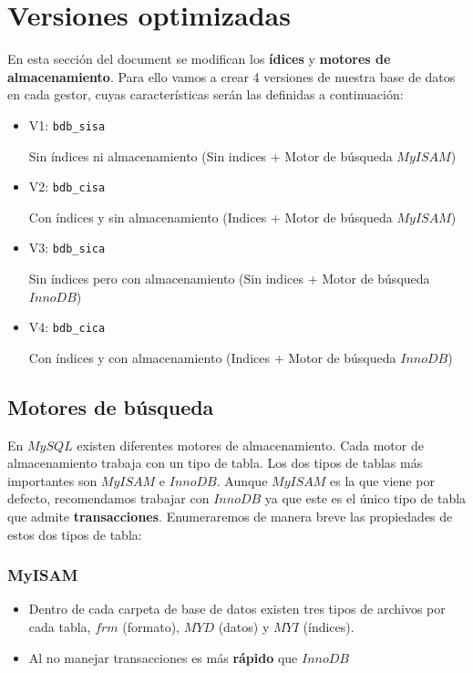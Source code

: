 \documentclass[12pt,a4paper]{article}
\begin{document}

\newpage
\section{Versiones optimizadas} \label{pto3} 

En esta sección del document se modifican los \textbf{ídices} y \textbf{motores de almacenamiento}. Para ello vamos a crear 4 versiones de nuestra base de datos en cada gestor, cuyas características serán las definidas a continuación:

\begin{itemize}
\item V1: \verb|bdb_sisa|

 Sin índices ni almacenamiento (Sin indices + Motor de búsqueda $MyISAM$)
\item V2: \verb|bdb_cisa|

Con índices y sin almacenamiento (Indices + Motor de búsqueda $MyISAM$)

\item V3: \verb|bdb_sica|

Sin índices pero con almacenamiento (Sin indices + Motor de búsqueda $InnoDB$)

\item V4: \verb|bdb_cica|

Con índices y con almacenamiento (Indices + Motor de búsqueda $InnoDB$)
\end{itemize}



\subsection{Motores de búsqueda} \label{pto31}

En $MySQL$ existen diferentes motores de almacenamiento. Cada motor de almacenamiento trabaja con un tipo de tabla. Los dos tipos de tablas más importantes son $MyISAM$ e $InnoDB$. Aunque $MyISAM$ es la que viene por defecto, recomendamos trabajar con $InnoDB$ ya que este es el único tipo de tabla que admite \textbf{transacciones}. Enumeraremos de manera breve las propiedades de estos dos tipos de tabla:
\subsubsection{MyISAM} \label{pto311}
\begin{itemize}
\item Dentro de cada carpeta de base de datos existen tres tipos de archivos por cada tabla, $frm$ (formato), $MYD$ (datos) y $MYI$ (índices).

\item Al no manejar transacciones es más \textbf{rápido} que $InnoDB$
\end{itemize}
\end{document}
